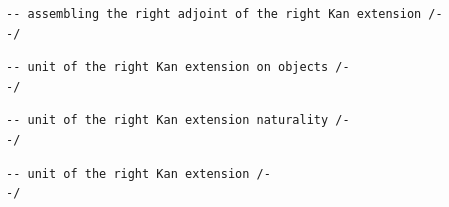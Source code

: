 \documentclass{book}
\theoremstyle{definition}
\newcounter{lcounter}
\begin{document}
\begin{center} \begin{tcolorbox}[width=5in,colback={white},title={\begin{center}\texttt{Lean \thelcounter} \addtocounter{lcounter}{1} \end{center}},colbacktitle=Blue,coltitle=black] \begin{verbatim}
-- assembling the right adjoint of the right Kan extension /-
-/
\end{verbatim} \end{tcolorbox} \end{center}
\begin{center} \begin{tcolorbox}[width=5in,colback={white},title={\begin{center}\texttt{Lean \thelcounter} \addtocounter{lcounter}{1} \end{center}},colbacktitle=Blue,coltitle=black] \begin{verbatim}
-- unit of the right Kan extension on objects /-
-/
\end{verbatim} \end{tcolorbox} \end{center}
\begin{center}

 \begin{tcolorbox}[width=5in,colback={white},title={\begin{center}\texttt{Lean \thelcounter} \addtocounter{lcounter}{1} \end{center}},colbacktitle=Blue,coltitle=black] \begin{verbatim}
-- unit of the right Kan extension naturality /-
-/
\end{verbatim} \end{tcolorbox} \end{center}
\begin{center} \begin{tcolorbox}[width=5in,colback={white},title={\begin{center}\texttt{Lean \thelcounter} \addtocounter{lcounter}{1} \end{center}},colbacktitle=Blue,coltitle=black] \begin{verbatim}
-- unit of the right Kan extension /-
-/
\end{verbatim} \end{tcolorbox} \end{center}
\end{document}
